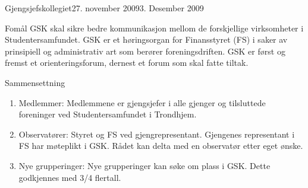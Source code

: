 \begin{instruks}{Gjengsjefskollegiet}{27. november 2009}{3. Desember 2009}

    \begin{instruksledd}{Fomål}
        GSK skal sikre bedre kommunikasjon mellom de forskjellige virksomheter i
        Studentersamfundet.
        GSK er et høringsorgan for Finansstyret (FS) i saker av prinsipiell og
        administrativ art som berører
        foreningsdriften. GSK er først og fremst et orienteringsforum, dernest et forum
        som skal fatte tiltak.
    \end{instruksledd}

    \begin{instruksledd}{Sammensettning}
        \begin{enumerate}
            \item Medlemmer:
                Medlemmene er gjengsjefer i alle gjenger og tilsluttede foreninger ved
                Studentersamfundet i Trondhjem.
            \item Observatører:
                Styret og FS ved gjengrepresentant. Gjengenes representant i FS har møteplikt i
                GSK. Rådet kan delta med
                en observatør etter eget ønske.
            \item Nye grupperinger:
                Nye grupperinger kan søke om plass i GSK. Dette godkjennes med 3/4 flertall.
        \end{enumerate}
    \end{instruksledd}


\end{instruks}
